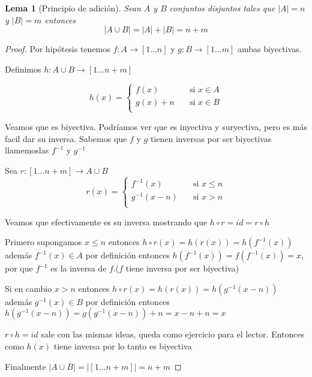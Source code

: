 \documentclass{article}
\theoremstyle{break}
\newtheorem{lemma}[theorem]{Lema}
\begin{document}
    \begin{lemma}[Principio de adición]\label{sec:padicion}
        Sean $A$ y $B$ conjuntos disjuntos tales que $|A| = n$ y $|B| = m$ entonces $$|A \cup B| = |A| + |B|=n+m$$    
    \end{lemma}
    \begin{proof}
        Por hipótesis tenemos $f: A \rightarrow [1\ldots n]$ y $g: B \rightarrow [1\ldots m]$ ambas biyectivas. 

        Definimos $h: A\cup B \rightarrow [1\ldots n+m]$

        \[   
            h(x) = 
            \begin{cases}
            f(x) &\quad\text{si } x\in A \\
            g(x) +n &\quad\text{si } x\in B \\

            \end{cases}
        \]

        Veamos que es biyectiva. Podríamos ver que es inyectiva y suryectiva, pero es más facil dar su inversa.
        Sabemos que $f$ y $g$ tienen inversas por ser biyectivas llamemoslas $f^{-1}$ y $g^{-1}$ 

        Sea $r: [1\ldots n+m] \rightarrow A \cup B $
        \[   
            r(x) = 
            \begin{cases}
            f^{-1}(x) &\quad\text{si } x\leq n \\
            g^{-1}(x - n)  &\quad\text{si } x > n \\

            \end{cases}
        \]

        Veamos que efectivamente es su inversa mostrando que $h \circ r = id = r \circ h$

        Primero supongamos $x \leq n$ entonces $h\circ r (x) = h (r(x)) = h (f^{-1}(x))$ además $f^{-1}(x) \in A$ por definición 
        entonces $h(f^{-1}(x)) = f(f^{-1}(x)) = x$, por que $f^{-1}$ es la inversa de $f$.($f$ tiene
        inversa por ser biyectiva)
        
        Si en cambio $x > n$ entonces $h\circ r (x) = h (r(x)) = h (g^{-1}(x -n))$  además $g^{-1}(x) \in B$ por definición
        entonces $h(g^{-1}(x-n)) = g(g^{-1}(x-n)) + n = x-n+n = x$
            
        $r\circ h = id$ sale con las mismas ideas, queda como ejercicio para el lector.
        Entonces como $h(x)$ tiene inversa por lo tanto es biyectiva

        Finalmente $|A\cup B| = |[1\ldots n+m]| = n+m$
    \end{proof}
\end{document}
